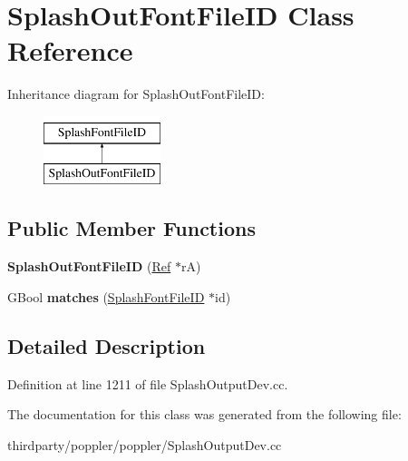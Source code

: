 \hypertarget{class_splash_out_font_file_i_d}{}\section{Splash\+Out\+Font\+File\+ID Class Reference}
\label{class_splash_out_font_file_i_d}
Inheritance diagram for Splash\+Out\+Font\+File\+ID\+:\begin{figure}[H]
\begin{center}
\leavevmode
\includegraphics[height=2.000000cm]{class_splash_out_font_file_i_d}
\end{center}
\end{figure}
\subsection*{Public Member Functions}
\begin{DoxyCompactItemize}
\item 
\mbox{\label{class_splash_out_font_file_i_d_a618b3c03ad813e356a92036a596df294}} 
{\bfseries Splash\+Out\+Font\+File\+ID} (\hyperlink{struct_ref}{Ref} $\ast$rA)
\item 
\mbox{\label{class_splash_out_font_file_i_d_ab47684d68f9370ebf066d60d174ef73c}} 
G\+Bool {\bfseries matches} (\hyperlink{class_splash_font_file_i_d}{Splash\+Font\+File\+ID} $\ast$id)
\end{DoxyCompactItemize}


\subsection{Detailed Description}


Definition at line 1211 of file Splash\+Output\+Dev.\+cc.



The documentation for this class was generated from the following file\+:\begin{DoxyCompactItemize}
\item 
thirdparty/poppler/poppler/Splash\+Output\+Dev.\+cc\end{DoxyCompactItemize}
